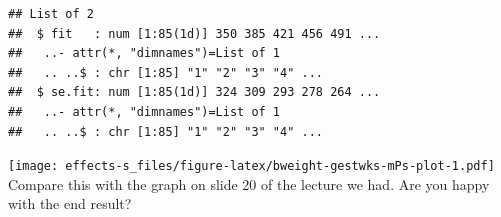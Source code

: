 \documentclass[
]{book}
\newenvironment{Shaded}{\begin{snugshade}}{\end{snugshade}}
\newcommand{\AttributeTok}[1]{\textcolor[rgb]{0.13,0.29,0.53}{#1}}
\newcommand{\CommentTok}[1]{\textcolor[rgb]{0.56,0.35,0.01}{\textit{#1}}}
\newcommand{\DecValTok}[1]{\textcolor[rgb]{0.00,0.00,0.81}{#1}}
\newcommand{\FloatTok}[1]{\textcolor[rgb]{0.00,0.00,0.81}{#1}}
\newcommand{\FunctionTok}[1]{\textcolor[rgb]{0.13,0.29,0.53}{\textbf{#1}}}
\newcommand{\NormalTok}[1]{#1}
\newcommand{\OtherTok}[1]{\textcolor[rgb]{0.56,0.35,0.01}{#1}}
\newcommand{\SpecialCharTok}[1]{\textcolor[rgb]{0.81,0.36,0.00}{\textbf{#1}}}
\begin{document}
\begin{verbatim}
## List of 2
##  $ fit   : num [1:85(1d)] 350 385 421 456 491 ...
##   ..- attr(*, "dimnames")=List of 1
##   .. ..$ : chr [1:85] "1" "2" "3" "4" ...
##  $ se.fit: num [1:85(1d)] 324 309 293 278 264 ...
##   ..- attr(*, "dimnames")=List of 1
##   .. ..$ : chr [1:85] "1" "2" "3" "4" ...
\end{verbatim}

\begin{Shaded}
\end{Shaded}

\texttt{[image: effects-s\_files/figure-latex/bweight-gestwks-mPs-plot-1.pdf]}
Compare this with the graph on slide 20 of the lecture we had.
Are you happy with the end result?
\end{document}
